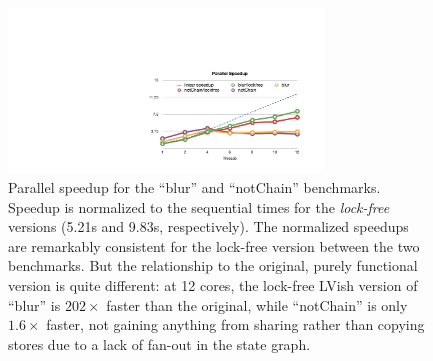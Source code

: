 

\begin{figure}  

\begin{center}
  \includegraphics[width=3.3in]{chapter4/figures/CFA_speedups.pdf}
\end{center}
  \caption{Parallel speedup for the ``blur'' and ``notChain'' benchmarks.
    Speedup is normalized to the sequential times for the {\em lock-free}
    versions (5.21s and 9.83s, respectively).  
%
    The normalized speedups are remarkably consistent for the lock-free version
    between the two benchmarks.  But the relationship to the original, purely
    functional version is quite different: at 12 cores, the lock-free LVish
    version of ``blur'' is $202\times$ faster than the original, while ``notChain'' is only
    $1.6\times$ faster, 
    not gaining anything from sharing rather than copying stores
    due to a lack of fan-out in the state graph.
}
  \label{fig:bench}
\end{figure}
